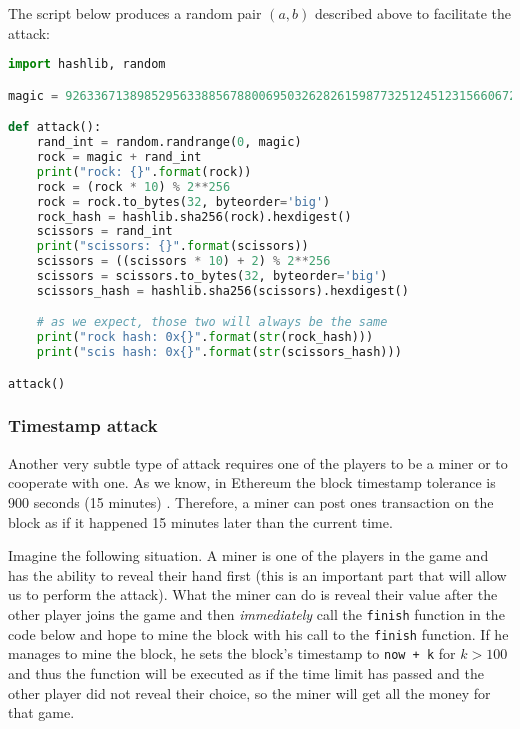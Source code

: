 \documentclass{article}
\begin{document}
    \noindent The script below produces a random pair \((a,
    b)\) described above to facilitate the attack:

    \begin{lstlisting}[language=Python]
import hashlib, random

magic = 92633671389852956338856788006950326282615987732512451231566067206330503711949

def attack():
    rand_int = random.randrange(0, magic)
    rock = magic + rand_int
    print("rock: {}".format(rock))
    rock = (rock * 10) % 2**256
    rock = rock.to_bytes(32, byteorder='big')
    rock_hash = hashlib.sha256(rock).hexdigest()
    scissors = rand_int
    print("scissors: {}".format(scissors))
    scissors = ((scissors * 10) + 2) % 2**256
    scissors = scissors.to_bytes(32, byteorder='big')
    scissors_hash = hashlib.sha256(scissors).hexdigest()

    # as we expect, those two will always be the same
    print("rock hash: 0x{}".format(str(rock_hash)))
    print("scis hash: 0x{}".format(str(scissors_hash)))

attack()
    \end{lstlisting}
    
    \subsubsection{Timestamp attack}
    Another very subtle type of attack requires one of the
    players to be a miner or to cooperate with one. As we
    know, in Ethereum the block timestamp tolerance is 900
    seconds (15 minutes) \cite{ethrules}. Therefore, a miner
    can post ones transaction on the block as if it happened
    15 minutes later than the current time.
    \newline

    \noindent Imagine the following situation. A miner is
    one of the players in the game and has the ability to
    reveal their hand first (this is an important part that
    will allow us to perform the attack). What the miner can
    do is reveal their value after the other player joins
    the game and then {\itshape immediately} call the
    \verb|finish| function in the code below and hope to
    mine the block with his call to the \verb|finish|
    function. If he manages to mine the block, he sets the
    block's timestamp to \verb|now + k| for \(k > 100\) and
    thus the function will be executed as if the time limit
    has passed and the other player did not reveal their
    choice, so the miner will get all the money for that
    game.
\end{document}

